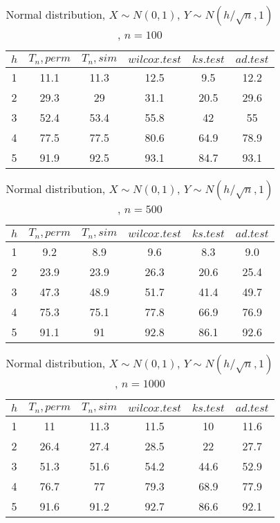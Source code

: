 \documentclass{svproc}
\begin{document}
\begin{table}
  \caption{Normal distribution, $X\sim N(0,1)$, $Y\sim N(h/\sqrt{n},1)$, $n=100$}
  \begin{center}
  \begin{tabular}{c@{\quad}c@{\quad}c@{\quad}c@{\quad}c@{\quad}c}
  \hline
  $h$ & $T_n, perm$ & $T_n, sim$ & $wilcox.test$ & $ks.test$ & $ad.test$ \\
  \hline
  1 & 11.1 & 11.3 & 12.5 & 9.5 & 12.2 \\
  2 & 29.3 & 29 & 31.1 & 20.5 & 29.6 \\
  3 & 52.4 & 53.4 & 55.8 & 42 & 55 \\
  4 & 77.5 & 77.5 & 80.6 & 64.9 & 78.9 \\
  5 & 91.9 & 92.5 & 93.1 & 84.7 & 93.1 \\
  \hline
  \end{tabular}
  \end{center}
\end{table}

\begin{table}
  \caption{Normal distribution, $X\sim N(0,1)$, $Y\sim N(h/\sqrt{n},1)$, $n=500$}
  \begin{center}
  \begin{tabular}{c@{\quad}c@{\quad}c@{\quad}c@{\quad}c@{\quad}c}
  \hline
  $h$ & $T_n, perm$ & $T_n, sim$ & $wilcox.test$ & $ks.test$ & $ad.test$ \\
  \hline
  1 & 9.2 & 8.9 & 9.6 & 8.3 & 9.0 \\
  2 & 23.9 & 23.9 & 26.3 & 20.6 & 25.4 \\
  3 & 47.3 & 48.9 & 51.7 & 41.4 & 49.7 \\
  4 & 75.3 & 75.1 & 77.8 & 66.9 & 76.9 \\
  5 & 91.1 & 91 & 92.8 & 86.1 & 92.6 \\
  \hline
  \end{tabular}
  \end{center}
\end{table}

\begin{table}
  \caption{Normal distribution, $X\sim N(0,1)$, $Y\sim N(h/\sqrt{n},1)$, $n=1000$}
  \begin{center}
  \begin{tabular}{c@{\quad}c@{\quad}c@{\quad}c@{\quad}c@{\quad}c}
  \hline
  $h$  & $T_n, perm$ & $T_n, sim$ & $wilcox.test$ & $ks.test$ & $ad.test$ \\
  \hline
  1 & 11 & 11.3 & 11.5 & 10 & 11.6 \\
  2 & 26.4 & 27.4 & 28.5 & 22 & 27.7 \\
  3 & 51.3 & 51.6 & 54.2 & 44.6 & 52.9 \\
  4 & 76.7 & 77 & 79.3 & 68.9 & 77.9 \\
  5 & 91.6 & 91.2 & 92.7 & 86.6 & 92.1 \\
  \hline
  \end{tabular}
  \end{center}
\end{table}
\end{document}
